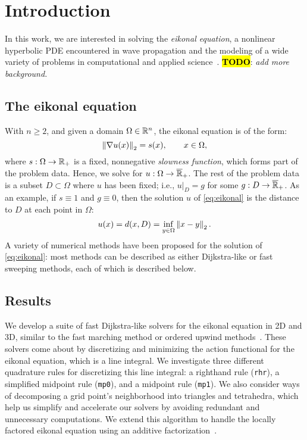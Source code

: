 \documentclass[eikonal.tex]{subfiles}
\begin{document}
\section{Introduction}\label{sec:introduction}

In this work, we are interested in solving the \emph{eikonal
  equation}, a nonlinear hyperbolic PDE encountered in wave
propagation and the modeling of a wide variety of problems in
computational and applied
science~\cite{sethian1999level}. \hl{\textbf{TODO}}: \emph{add more
  background.}

\subsection{The eikonal equation}

With $n \geq 2$, and given a domain $\Omega \in \mathbb{R}^n$, the eikonal
equation is of the form:
\begin{equation}\label{eq:eikonal}
  \norm{\nabla u(x)}_2 = s(x), \qquad x \in \Omega,
\end{equation}
where $s : \Omega \to \mathbb{R}_+$ is a fixed, nonnegative \emph{slowness
  function}, which forms part of the problem data. Hence, we solve for
$u : \Omega \to \overline{\mathbb{R}}_+$. The rest of the problem data is a
subset $D \subset \Omega$ where $u$ has been fixed; i.e.,
$\left. u \right|_D = g$ for some $g : D \to \overline{\mathbb{R}}_+$. As an
example, if $s \equiv 1$ and $g \equiv 0$, then the solution $u$ of
\cref{eq:eikonal} is the distance to $D$ at each point in $\Omega$:
\begin{equation}
  \label{eq:distance-to-Omega}
  u(x) = d(x, D) = \inf_{y \in \Omega} \norm{x - y}_2.
\end{equation}
A variety of numerical methods have been proposed for the solution of
\cref{eq:eikonal}: most methods can be described as either
Dijkstra-like or fast sweeping methods, each of which is described
below.

\subsection{Results}

We develop a suite of fast Dijkstra-like solvers for the eikonal
equation in 2D and 3D, similar to the fast marching method or ordered
upwind methods~\cite{sethian1996fast,sethian2003ordered}. These
solvers come about by discretizing and minimizing the action
functional for the eikonal equation, which is a line integral. We
investigate three different quadrature rules for discretizing this
line integral: a righthand rule (\texttt{rhr}), a simplified midpoint
rule (\texttt{mp0}), and a midpoint rule (\texttt{mp1}). We also
consider ways of decomposing a grid point's neighborhood into
triangles and tetrahedra, which help us simplify and accelerate our
solvers by avoiding redundant and unnecessary computations. We extend
this algorithm to handle the locally factored eikonal equation using
an additive factorization~\cite{luo2012fast, qi2018corner}.
\end{document}
